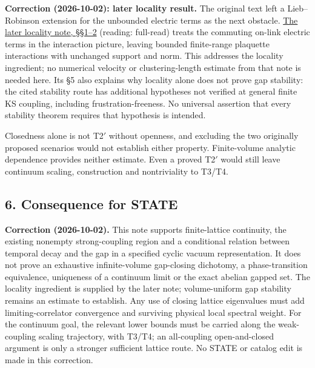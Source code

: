 \documentclass[11pt,a4paper]{article}
\begin{document}
\textbf{Correction (2026-10-02): later locality result.} The original
text left a Lieb--Robinson extension for the unbounded electric terms as
the next obstacle. \href{lieb-robinson-kogut-susskind.md}{The later
locality note, §§1--2} (reading: full-read) treats the commuting on-link
electric terms in the interaction picture, leaving bounded finite-range
plaquette interactions with unchanged support and norm. This addresses
the locality ingredient; no numerical velocity or clustering-length
estimate from that note is needed here. Its §5 also explains why
locality alone does not prove gap stability: the cited stability route
has additional hypotheses not verified at general finite KS coupling,
including frustration-freeness. No universal assertion that every
stability theorem requires that hypothesis is intended.

Closedness alone is not T2\('\) without openness, and excluding the two
originally proposed scenarios would not establish either property.
Finite-volume analytic dependence provides neither estimate. Even a
proved T2\('\) would still leave continuum scaling, construction and
nontriviality to T3/T4.

\subsection{6. Consequence for STATE}\label{consequence-for-state}

\textbf{Correction (2026-10-02).} This note supports finite-lattice
continuity, the existing nonempty strong-coupling region and a
conditional relation between temporal decay and the gap in a specified
cyclic vacuum representation. It does not prove an exhaustive
infinite-volume gap-closing dichotomy, a phase-transition equivalence,
uniqueness of a continuum limit or the exact abelian gapped set. The
locality ingredient is supplied by the later note; volume-uniform gap
stability remains an estimate to establish. Any use of closing lattice
eigenvalues must add limiting-correlator convergence and surviving
physical local spectral weight. For the continuum goal, the relevant
lower bounds must be carried along the weak-coupling scaling trajectory,
with T3/T4; an all-coupling open-and-closed argument is only a stronger
sufficient lattice route. No STATE or catalog edit is made in this
correction.
\end{document}
